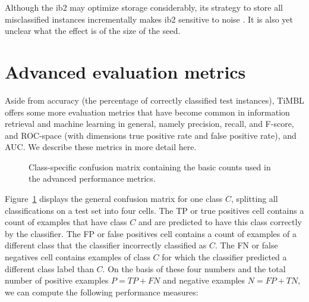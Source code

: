 \documentclass{book}
\begin{document}
Although the {\sc ib2} may optimize storage
considerably, its strategy to store all misclassified instances
incrementally makes {\sc ib2} sensitive to noise \cite{Aha+91}. It is
also yet unclear what the effect is of the size of the seed.

\section{Advanced evaluation metrics}
\label{advancedstats}

Aside from accuracy (the percentage of correctly classified test
instances), TiMBL offers some more evaluation metrics that have become
common in information retrieval and machine learning in general,
namely precision, recall, and F-score, and ROC-space (with dimensions
true positive rate and false positive rate), and AUC. We describe
these metrics in more detail here.

\begin{figure}
\begin{center}
\vspace*{-0.5cm}
\end{center}
\caption{Class-specific confusion matrix containing the basic counts
  used in the advanced performance metrics. \label{confmat}}
\end{figure}

Figure~\ref{confmat} displays the general confusion
matrix for one class $C$, splitting all
classifications on a test set into four cells. The TP or true
positives cell contains a count of examples that have class $C$ and
are predicted to have this class correctly by the classifier. The FP
or false positives cell contains a count of examples of a different
class that the classifier incorrectly classified as $C$. The FN or
false negatives cell contains examples of class $C$ for which the
classifier predicted a different class label than $C$.  On the basis
of these four numbers and the total number of positive examples
$P=TP+FN$ and negative examples $N=FP+TN$, we can compute the
following performance measures:
\end{document}
